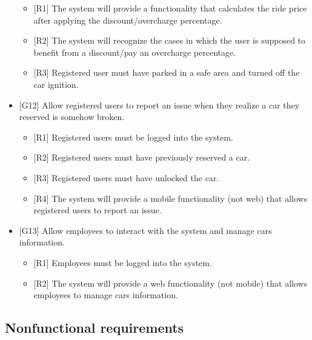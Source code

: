 \begin{itemize}
	\begin{itemize}
		\item {[R1]} The system will provide a functionality that calculates the ride price after applying the discount/overcharge percentage.
		\item {[R2]} The system will recognize the cases in which the user is supposed to benefit from a discount/pay an overcharge percentage.
		\item {[R3]} Registered user must have parked in a safe area and turned off the car ignition.
	\end{itemize}
	\item {[G12]} Allow registered users to report an issue when they realize a car they reserved is somehow broken.
	\begin{itemize}
		\item {[R1]} Registered users must be logged into the system.
		\item {[R2]} Registered users must have previously reserved a car.
		\item {[R3]} Registered users must have unlocked the car.
		\item {[R4]} The system will provide a mobile functionality (not web) that allows registered users to report an issue.
	\end{itemize}
	\item {[G13]} Allow employees to interact with the system and manage cars information.
	\begin{itemize}
		\item {[R1]} Employees must be logged into the system.
		\item {[R2]} The system will provide a web functionality (not mobile) that allows employees to manage cars information.
	\end{itemize}
\end{itemize}
\newpage
\subsection{Nonfunctional requirements}
